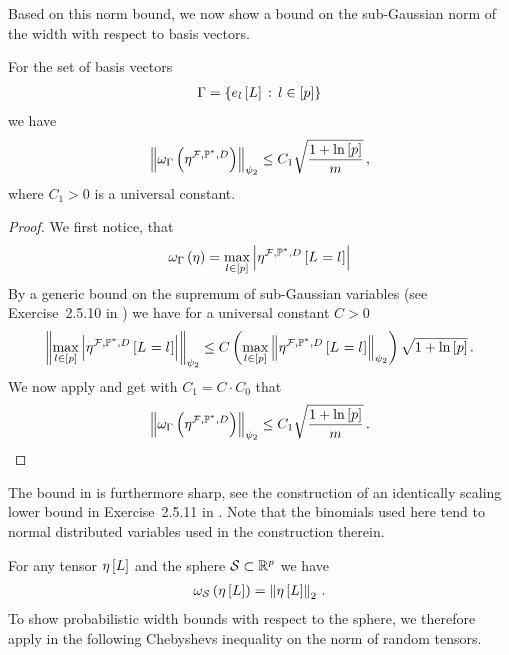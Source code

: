 Based on this norm bound, we now show a bound on the sub-Gaussian norm of the width with respect to basis vectors.

\begin{theorem}
    \label{the:basisTensorWidthBound}
    For the set of basis vectors
    \begin{align*}
        \Gamma = \{e_{l}\left[L\right] \,:\, l\in[p] \}
    \end{align*}
    we have
    \begin{align*}
        \left\|\omega_{\Gamma}\left(\eta^{\mathcal{F},\mathbb{P}^*,D}\right)\right\|_{\psi_2} \leq C_1 \sqrt{\frac{1+\ln \left[ p \right]}{m}} \, ,
    \end{align*}
    where $C_1>0$ is a universal constant.
\end{theorem}
\begin{proof}
    We first notice, that
    \begin{align*}
        \omega_{\Gamma}\left(\eta\right) = \max_{l\in[p]} \left|\eta^{\mathcal{F},\mathbb{P}^*,D}\left[L_{}=l_{}\right]\right|
    \end{align*}
    By a generic bound on the supremum of sub-Gaussian variables (see Exercise~2.5.10 in \cite{vershynin_high-dimensional_2018}) we have for a universal constant $C>0$
    \begin{align*}
        \left\|\max_{l\in[p]}\left|\eta^{\mathcal{F},\mathbb{P}^*,D}\left[L_{}=l_{}\right]\right|\right\|_{\psi_2}
        \leq C \left(\max_{l\in[p]}\left\|\eta^{\mathcal{F},\mathbb{P}^*,D}\left[L_{}=l_{}\right]\right\|_{\psi_2}\right) \sqrt{1 + \ln \left[ p \right]} \, .
    \end{align*}
    We now apply  and get with $C_1=C\cdot C_0$ that
        \begin{align*}
        \left\|\omega_{\Gamma}\left(\eta^{\mathcal{F},\mathbb{P}^*,D}\right)\right\|_{\psi_2} \leq C_1 \sqrt{\frac{1+\ln \left[ p \right]}{m}}  \, .
    \end{align*}
\end{proof}

The bound in  is furthermore sharp, see the construction of an identically scaling lower bound in Exercise~2.5.11 in \cite{vershynin_high-dimensional_2018}.
Note that the binomials used here tend to normal distributed variables used in the construction therein.


For any tensor $\eta\left[L\right]$ and the sphere $\mathcal{S}\subset\mathbb{R}^{p}$ we have
\begin{align*}
    \omega_{\mathcal{S}}\left(\eta\left[L\right]\right)
    = \left\|\eta\left[L\right]\right\|_{2} \, .
\end{align*}
To show probabilistic width bounds with respect to the sphere, we therefore apply in the following Chebyshevs inequality on the norm of random tensors.


